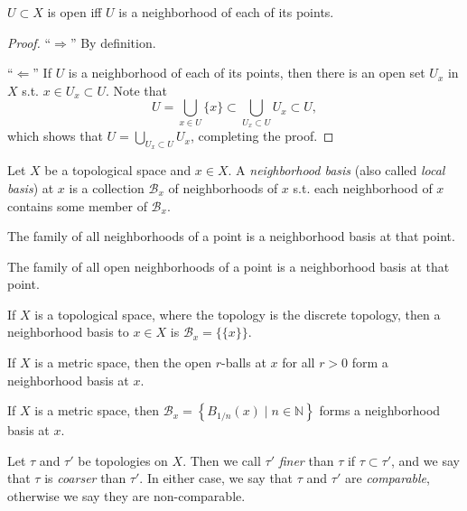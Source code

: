 \begin{theorem}\label{thrm:open_via_nbd}
	$U\subset X$ is open iff $U$ is a neighborhood of each of its points.
\end{theorem}

\begin{proof}
	\enquote{$\Rightarrow$} By definition.
	
	\enquote{$\Leftarrow$} If $U$ is a neighborhood of each of its points, then there is an open set $U_x$ in $X$ s.t. $x\in U_x\subset U$. Note that \cite{3964428}
	$$U = \bigcup_{x\in U}\{x\} \subset \bigcup_{U_x\subset U}U_x\subset U,$$ which shows that $U = \bigcup_{U_x\subset U}U_x$, completing the proof.
\end{proof}

\begin{defn}
	Let $X$ be a topological space and $x\in X$. A \textit{neighborhood basis} (also called \textit{local basis}) at $x$ is a collection $\mathscr B_x$ of neighborhoods of $x$ s.t. each neighborhood of $x$ contains some member of $\mathscr B_x$.
\end{defn}

\begin{exmp}
	The family of all neighborhoods of a point is a neighborhood basis at that point.
\end{exmp}

\begin{exmp}
	The family of all open neighborhoods of a point is a neighborhood basis at that point.
\end{exmp}

\begin{exmp}
	If $X$ is a topological space, where the topology is the discrete topology, then a neighborhood basis to $x\in X$ is $\mathscr B_x = \{\{x\}\}$.
\end{exmp}

\begin{exmp}
	If $X$ is a metric space, then the open $r$-balls at $x$ for all $r > 0$ form a neighborhood basis at $x$.
\end{exmp}

\begin{exmp}\label{exmp:metrizable_top_space_countable_neighborhood_basis}
	If $X$ is a metric space, then $\mathscr B_x = \left\{B_{1/n}(x) \mid n\in\mathbb N\right\}$ forms a neighborhood basis at $x$.
\end{exmp}

\begin{defn}\label{defn:comparison_of_topologies}
	Let $\tau$ and $\tau'$ be topologies on $X$. Then we call $\tau'$ \textit{finer} than $\tau$ if $\tau\subset\tau'$, and we say that $\tau$ is \textit{coarser} than $\tau'$. In either case, we say that $\tau$ and $\tau'$ are \textit{comparable}, otherwise we say they are non-comparable.
\end{defn}

